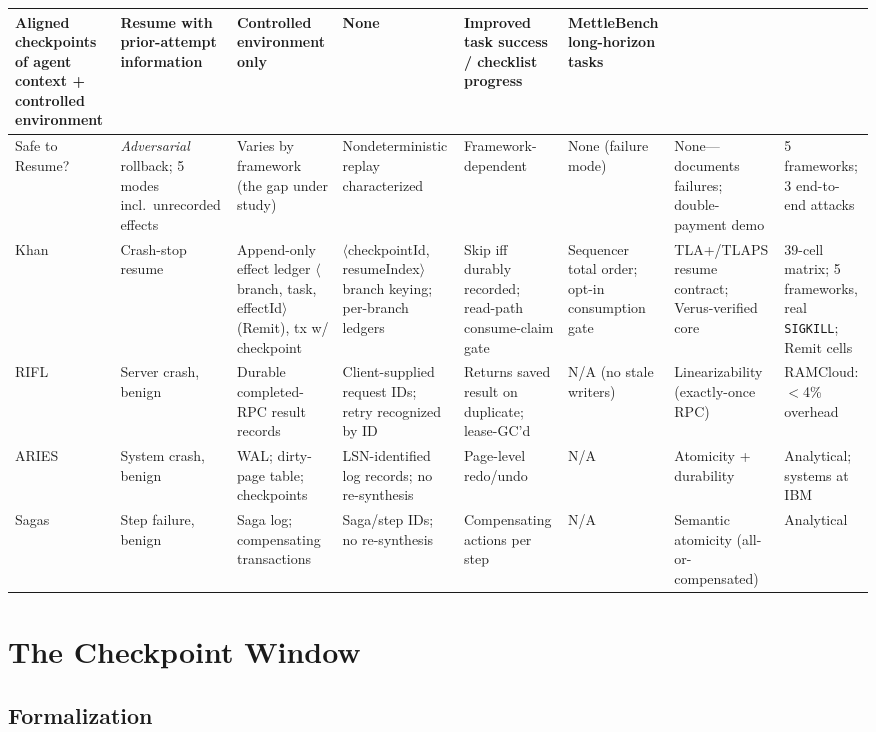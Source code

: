 \documentclass[10pt,journal,compsoc]{IEEEtran}
\begin{document}
\begin{table}[t]
\begin{tabular}{p{1.7cm}p{1.8cm}p{1.9cm}p{1.9cm}p{1.9cm}p{1.5cm}p{1.8cm}p{1.9cm}}
Aligned checkpoints of agent context + controlled environment &
Resume with prior-attempt information &
Controlled environment only &
None &
Improved task success / checklist progress &
MettleBench long-horizon tasks \\
\midrule
Safe to Resume?~\cite{safutoresume2026} &
\emph{Adversarial} rollback; 5 modes incl.\ unrecorded effects &
Varies by framework (the gap under study) &
Nondeterministic replay characterized &
Framework-dependent &
None (failure mode) &
None---documents failures; double-payment demo &
5 frameworks; 3 end-to-end attacks \\
\midrule
Khan~\cite{khan2026resume} &
Crash-stop resume &
Append-only effect ledger $\langle$branch, task, effectId$\rangle$ (Remit), tx w/ checkpoint &
$\langle$checkpointId, resumeIndex$\rangle$ branch keying; per-branch ledgers &
Skip iff durably recorded; read-path consume-claim gate &
Sequencer total order; opt-in consumption gate &
TLA+/TLAPS resume contract; Verus-verified core &
39-cell matrix; 5 frameworks, real \texttt{SIGKILL}; Remit cells \\
\midrule
RIFL~\cite{rifl2015} &
Server crash, benign &
Durable completed-RPC result records &
Client-supplied request IDs; retry recognized by ID &
Returns saved result on duplicate; lease-GC'd &
N/A (no stale writers) &
Linearizability (exactly-once RPC) &
RAMCloud: $<$4\% overhead \\
\midrule
ARIES~\cite{aries1992} &
System crash, benign &
WAL; dirty-page table; checkpoints &
LSN-identified log records; no re-synthesis &
Page-level redo/undo &
N/A &
Atomicity + durability &
Analytical; systems at IBM \\
\midrule
Sagas~\cite{sagas1987} &
Step failure, benign &
Saga log; compensating transactions &
Saga/step IDs; no re-synthesis &
Compensating actions per step &
N/A &
Semantic atomicity (all-or-compensated) &
Analytical \\
\bottomrule
\end{tabular}
\end{table}

\section{The Checkpoint Window}
\label{sec:problem}

\subsection{Formalization}
\end{document}
